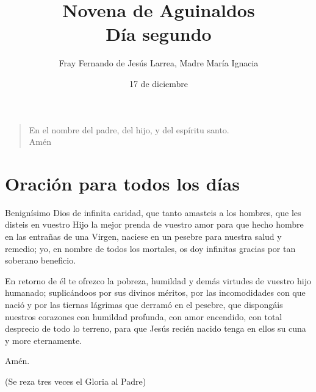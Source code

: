 \documentclass[spanish,utf8,12pt]{chlart}
\title{Novena de Aguinaldos\\Día segundo}
\author{Fray Fernando de Jesús Larrea, Madre María Ignacia}
\date{17 de diciembre}
\newenvironment{lectura}{\begingroup\color{lector}}{\endgroup\par}
\newenvironment{finalnotes}{\begingroup
	\footnotesize\sffamily\color{Gray}%
	\setlength{\leftskip}{3em}\setlength{\rightskip}{3em}\noindent
	}{\par\endgroup}
\newenvironment{gozo}{\begin{verse}\color{lector}}{\end{verse}}
\begin{document}
\maketitle

\begin{gozo}
En el nombre del padre, del hijo, y del espíritu santo.\\Amén
\end{gozo}
\section{Oración para todos los días}

\begin{lectura}
Benignísimo Dios de infinita caridad, que tanto amasteis a los hombres,
que les disteis en vuestro Hijo la mejor prenda de vuestro amor para que
hecho hombre en las entrañas de una Virgen, naciese en un pesebre para
nuestra salud y remedio; yo, en nombre de todos los mortales, os doy
infinitas gracias por tan soberano beneficio.

En retorno de él te ofrezco la pobreza, humildad y demás virtudes de
vuestro hijo humanado; suplicándoos por sus divinos méritos, por las
incomodidades con que nació y por las tiernas lágrimas que derramó en
el pesebre, que dispongáis nuestros corazones con humildad profunda,
con amor encendido, con total desprecio de todo lo terreno, para que
Jesús recién nacido tenga en ellos su cuna y more eternamente.

Amén.
\end{lectura}
\begin{finalnotes}
(Se reza tres veces el Gloria al Padre)
\end{finalnotes}
\end{document}
